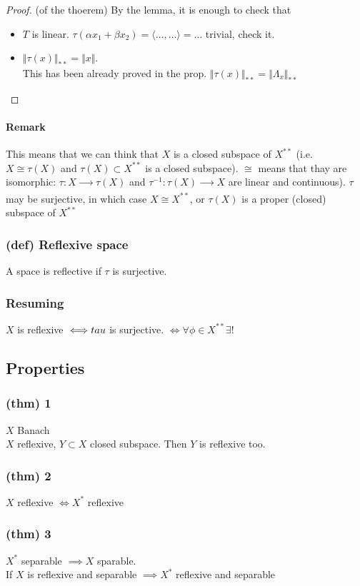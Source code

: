 \begin{proof}
    (of the thoerem)
    By the lemma, it is enough to check that
    \begin{itemize}
        \item $T$ is linear. $\tau(\alpha x_1+\beta x_2)=\langle \dots,\dots\rangle = \dots$ trivial, check it.
        \item $\Vert \tau (x)\Vert_{**}=\Vert x\Vert $.\\
        This has been already proved in the prop. $\Vert \tau (x)\Vert_{**}=\Vert \Lambda_x\Vert _{**}$
    \end{itemize}
\end{proof}
\paragraph{Remark}
This means that we can think that $X$ is a closed subspace of $X^{**}$ (i.e. $X\cong \tau(X)$ and $\tau (X)\subset X^{**}$ is a closed subspace).
$\cong$ means that thay are isomorphic: $\tau :X\xrightarrow[\quad\quad]{}\tau (X)$ and $\tau^{-1} :\tau(X)\xrightarrow[\quad\quad]{}X$ are linear and continuous).
$\tau$ may be surjective, in which case $X\cong X^{**}$, or $\tau(X)$ is a proper (closed) subspace of $X^{**}$

\subsubsection{(def) Reflexive space}
A space is reflective if $\tau$ is surjective.
\subsubsection{Resuming}
$X$ is reflexive $\iff \\tau$ is surjective. $\iff \forall \phi \in X^{**} \exists!$  
\subsection{Properties}
\subsubsection{(thm) 1}
$X$ Banach\\
$X$ reflexive, $Y\subset X$ closed subspace. Then $Y$ is reflexive too.
\subsubsection{(thm) 2}
$X$ reflexive $\iff X^*$ reflexive
\subsubsection{(thm) 3}
$X^*$ separable $\implies X$ sparable.\\
If $X$ is reflexive and separable $\implies X^*$ reflexive and separable

